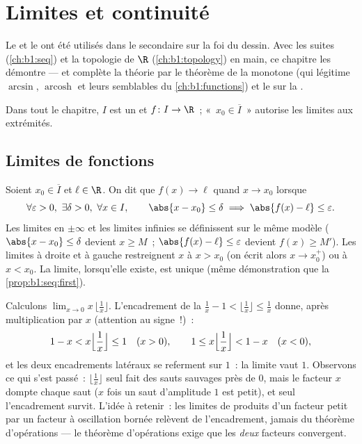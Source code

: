 \chapter{Limites et continuité}\label{ch:b1:continuity}

Le  et le  ont été utilisés dans le secondaire sur la foi du dessin. Avec les
suites (\cref{ch:b1:seq}) et la topologie de $\R$
(\cref{ch:b1:topology}) en main, ce chapitre les démontre --- et
complète la théorie par le théorème de la  monotone (qui
légitime $\arcsin$, $\operatorname{arcosh}$ et leurs semblables du
\cref{ch:b1:functions}) et le  sur la .

Dans tout le chapitre, $I$ est un  et $f \colon I \to \R$~;
«~$x_0 \in \overline I$~» autorise les limites aux extrémités.

\section{Limites de fonctions}

\begin{definition}\label{def:b1:continuity:limit}
Soient $x_0 \in \overline{I}$ et $\ell \in \R$. On dit que $f(x) \to
\ell$ quand $x \to x_0$ lorsque
\[
\forall \varepsilon > 0,\ \exists \delta > 0,\ \forall x \in I,
\qquad \abs{x - x_0} \leq \delta \implies \abs{f(x) - \ell} \leq
\varepsilon .
\]
Les limites en $\pm\infty$ et les limites infinies se définissent sur
le même modèle ($\abs{x - x_0} \leq \delta$ devient $x \geq M$~;
$\abs{f(x) - \ell} \leq \varepsilon$ devient $f(x) \geq M'$). Les
limites à droite et à gauche restreignent $x$ à $x > x_0$ (on écrit
alors $x \to x_0^+$) ou à $x < x_0$. La limite, lorsqu'elle existe,
est unique (même démonstration que la
\cref{prop:b1:seq:first}).
\end{definition}

\begin{example}\label{ex:b1:continuity:floorlimit}
Calculons $\lim_{x \to 0} x\,\bigl\lfloor \frac1x \bigr\rfloor$.
L'encadrement de la  $\frac1x - 1 < \lfloor \frac1x
\rfloor \leq \frac1x$ donne, après multiplication par $x$ (attention
au signe~!)~:
\[
1 - x < x\Bigl\lfloor \frac1x \Bigr\rfloor \leq 1 \quad (x > 0),
\qquad
1 \leq x\Bigl\lfloor \frac1x \Bigr\rfloor < 1 - x \quad (x < 0),
\]
et les deux encadrements latéraux se referment sur $1$~: la limite
vaut $1$. Observons ce qui s'est passé~: $\lfloor \frac1x\rfloor$
seul fait des sauts sauvages près de $0$, mais le facteur $x$ dompte
chaque saut ($x$ fois un saut d'amplitude $1$ est petit), et seul
l'encadrement survit. L'idée à retenir~: les limites de produits d'un
facteur petit par un facteur à oscillation bornée relèvent de
l'encadrement, jamais du théorème d'opérations --- le théorème
d'opérations exige que les \emph{deux} facteurs convergent.
\end{example}

